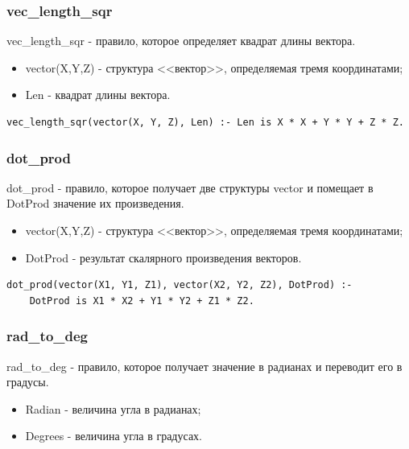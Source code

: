 \subsubsection{vec\_length\_sqr}

\hspace{0.6cm} vec\_length\_sqr - правило, которое определяет квадрат длины вектора.

\begin{itemize}
	\item vector(X,Y,Z) - структура <<вектор>>, определяемая тремя координатами;
	\item Len - квадрат длины вектора.
\end{itemize}

\begin{lstlisting}[caption=Реализация правила vec\_length\_sqr, label=rules:veclengthsqr]
vec_length_sqr(vector(X, Y, Z), Len) :- Len is X * X + Y * Y + Z * Z.
\end{lstlisting}

\subsubsection{dot\_prod}
\hspace{0.6cm} dot\_prod - правило, которое получает две структуры vector и помещает в DotProd значение их произведения.

\begin{itemize}
	\item vector(X,Y,Z) - структура <<вектор>>, определяемая тремя координатами;
	\item DotProd - результат скалярного произведения векторов.
\end{itemize}

\begin{lstlisting}[caption=Реализация правила dot\_prod, label=rules:dotprod]
dot_prod(vector(X1, Y1, Z1), vector(X2, Y2, Z2), DotProd) :-
	DotProd is X1 * X2 + Y1 * Y2 + Z1 * Z2.
\end{lstlisting}

\subsubsection{rad\_to\_deg}
\hspace{0.6cm} rad\_to\_deg - правило, которое получает значение в радианах и переводит его в градусы.

\begin{itemize}
	\item Radian - величина угла в радианах;
	\item Degrees - величина угла в градусах.
\end{itemize}

